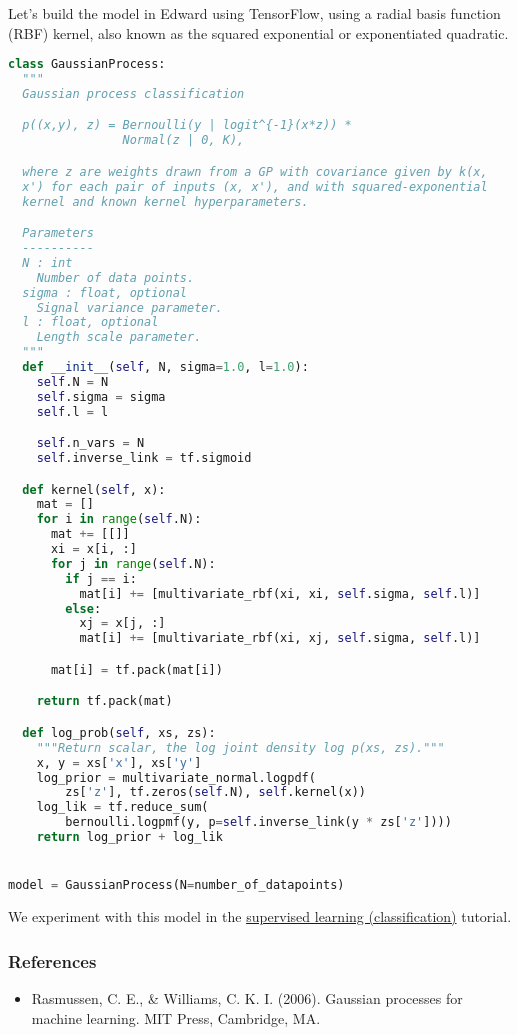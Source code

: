 Let's build the model in Edward using TensorFlow, using a radial basis function
(RBF) kernel, also known as the squared exponential or exponentiated quadratic.
\begin{lstlisting}[language=Python]
class GaussianProcess:
  """
  Gaussian process classification

  p((x,y), z) = Bernoulli(y | logit^{-1}(x*z)) *
                Normal(z | 0, K),

  where z are weights drawn from a GP with covariance given by k(x,
  x') for each pair of inputs (x, x'), and with squared-exponential
  kernel and known kernel hyperparameters.

  Parameters
  ----------
  N : int
    Number of data points.
  sigma : float, optional
    Signal variance parameter.
  l : float, optional
    Length scale parameter.
  """
  def __init__(self, N, sigma=1.0, l=1.0):
    self.N = N
    self.sigma = sigma
    self.l = l

    self.n_vars = N
    self.inverse_link = tf.sigmoid

  def kernel(self, x):
    mat = []
    for i in range(self.N):
      mat += [[]]
      xi = x[i, :]
      for j in range(self.N):
        if j == i:
          mat[i] += [multivariate_rbf(xi, xi, self.sigma, self.l)]
        else:
          xj = x[j, :]
          mat[i] += [multivariate_rbf(xi, xj, self.sigma, self.l)]

      mat[i] = tf.pack(mat[i])

    return tf.pack(mat)

  def log_prob(self, xs, zs):
    """Return scalar, the log joint density log p(xs, zs)."""
    x, y = xs['x'], xs['y']
    log_prior = multivariate_normal.logpdf(
        zs['z'], tf.zeros(self.N), self.kernel(x))
    log_lik = tf.reduce_sum(
        bernoulli.logpmf(y, p=self.inverse_link(y * zs['z'])))
    return log_prior + log_lik


model = GaussianProcess(N=number_of_datapoints)
\end{lstlisting}

We experiment with this model in the
\href{tut_supervised_classification}{supervised learning (classification)} tutorial.

\subsubsection{References}\label{references}

\begin{itemize}
\item
  Rasmussen, C. E., \& Williams, C. K. I. (2006). Gaussian processes
  for machine learning. MIT Press, Cambridge, MA.
\end{itemize}
